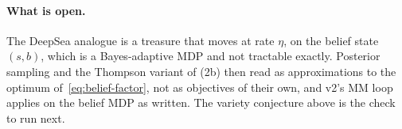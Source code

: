 \documentclass[11pt]{article}
\theoremstyle{remark}
\newcommand{\1}{\mathds{1}}
\begin{document}
\paragraph{What is open.}
The DeepSea analogue is a treasure that moves at rate $\eta$, on the belief state $(s,b)$, which is a Bayes-adaptive MDP and not tractable exactly.
Posterior sampling and the Thompson variant of (2b) then read as approximations to the optimum of~\eqref{eq:belief-factor}, not as objectives of their own, and v2's MM loop applies on the belief MDP as written.
The variety conjecture above is the check to run next.


  {\newcommand{\bibs}{action-sufficient,notes_joery/joery}}
  {\newcommand{\bibs}{../action-sufficient,joery}}

\end{document}
